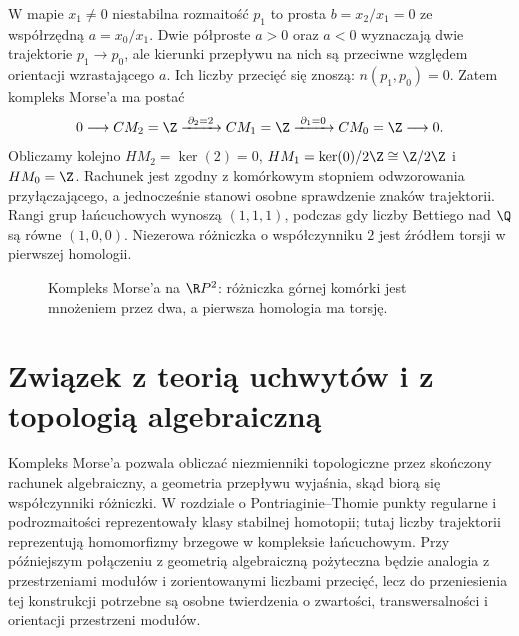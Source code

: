 \begin{przyklad}
W mapie $x_1\ne0$ niestabilna rozmaitość $p_1$
to prosta $b=x_2/x_1=0$ ze współrzędną $a=x_0/x_1$.
Dwie półproste $a>0$ oraz $a<0$ wyznaczają dwie
trajektorie $p_1\to p_0$, ale kierunki przepływu
na nich są przeciwne względem orientacji wzrastającego
$a$. Ich liczby przecięć się znoszą:
$n(p_1,p_0)=0$. Zatem kompleks Morse'a ma postać
\[
 0\longrightarrow CM_2=\Z
 \xrightarrow{\;\partial_2=2\;} CM_1=\Z
 \xrightarrow{\;\partial_1=0\;} CM_0=\Z
 \longrightarrow0.
\]
Obliczamy kolejno $HM_2=\ker(2)=0$,
$HM_1=\ker(0)/2\Z\cong\Z/2\Z$ i $HM_0=\Z$.
Rachunek jest zgodny z komórkowym stopniem odwzorowania
przyłączającego, a jednocześnie stanowi osobne sprawdzenie
znaków trajektorii. Rangi grup łańcuchowych wynoszą
$(1,1,1)$, podczas gdy liczby Bettiego nad $\Q$
są równe $(1,0,0)$. Niezerowa różniczka o współczynniku
$2$ jest źródłem torsji w pierwszej homologii.
\end{przyklad}

\begin{figure}[!htbp]
\centering
{}
\caption{Kompleks Morse'a na $\R P^2$:
różniczka górnej komórki jest mnożeniem przez dwa,
a pierwsza homologia ma torsję.}
\label{fig:morse-rp2-torsja}
\end{figure}

\section{Związek z teorią uchwytów i z topologią algebraiczną}
Kompleks Morse'a pozwala obliczać niezmienniki topologiczne
przez skończony rachunek algebraiczny, a geometria przepływu
wyjaśnia, skąd biorą się współczynniki różniczki.
W rozdziale o Pontriaginie--Thomie punkty regularne
i podrozmaitości reprezentowały klasy stabilnej homotopii;
tutaj liczby trajektorii reprezentują homomorfizmy brzegowe w
kompleksie łańcuchowym. Przy późniejszym połączeniu z geometrią algebraiczną
pożyteczna będzie analogia z przestrzeniami modułów i
zorientowanymi liczbami przecięć, lecz do przeniesienia tej
konstrukcji potrzebne są osobne twierdzenia o zwartości,
transwersalności i orientacji przestrzeni modułów.


